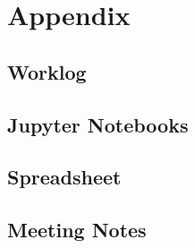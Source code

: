 \chapter{Appendix}

\section{Worklog}

\section{Jupyter Notebooks}
%

\section{Spreadsheet}
%

\section{Meeting Notes}
%
%